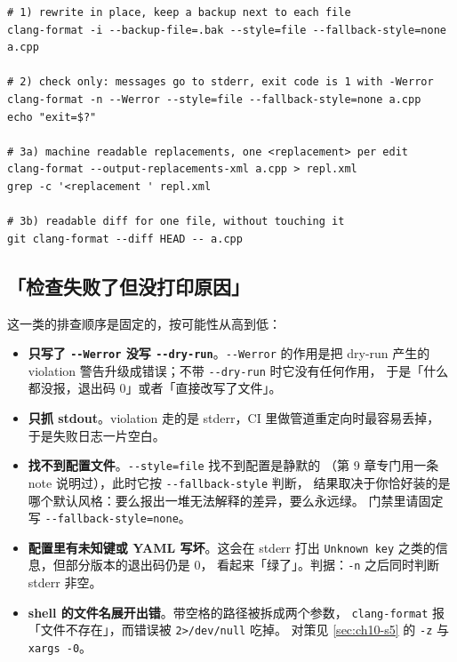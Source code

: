 \documentclass[12pt,a4paper,fontset=fandol]{ctexbook}
\newcommand{\Opt}[1]{\texttt{-\/-#1}}
\begin{document}
\begin{lstlisting}[style=shellstyle,caption={三种模式的真实调用与输出形态},label={lst:ch10-modes}]
# 1) rewrite in place, keep a backup next to each file
clang-format -i --backup-file=.bak --style=file --fallback-style=none a.cpp

# 2) check only: messages go to stderr, exit code is 1 with -Werror
clang-format -n --Werror --style=file --fallback-style=none a.cpp
echo "exit=$?"

# 3a) machine readable replacements, one <replacement> per edit
clang-format --output-replacements-xml a.cpp > repl.xml
grep -c '<replacement ' repl.xml

# 3b) readable diff for one file, without touching it
git clang-format --diff HEAD -- a.cpp
\end{lstlisting}

\subsection{「检查失败了但没打印原因」}\label{sec:ch10-s1-exit}

这一类的排查顺序是固定的，按可能性从高到低：

\begin{itemize}
  \item \textbf{只写了 \Opt{Werror} 没写 \Opt{dry-run}}。\Opt{Werror} 的作用是把
    dry-run 产生的 violation 警告升级成错误；不带 \Opt{dry-run} 时它没有任何作用，
    于是「什么都没报，退出码 0」或者「直接改写了文件」。
  \item \textbf{只抓 stdout}。violation 走的是 stderr，CI 里做管道重定向时最容易丢掉，
    于是失败日志一片空白。
  \item \textbf{找不到配置文件}。\Opt{style=file} 找不到配置是静默的
    （第 9 章专门用一条 note 说明过），此时它按 \Opt{fallback-style} 判断，
    结果取决于你恰好装的是哪个默认风格：要么报出一堆无法解释的差异，要么永远绿。
    门禁里请固定写 \Opt{fallback-style=none}。
  \item \textbf{配置里有未知键或 YAML 写坏}。这会在 stderr 打出
    \texttt{Unknown key} 之类的信息，但部分版本的退出码仍是 0，
    看起来「绿了」。判据：\texttt{-n} 之后同时判断 stderr 非空。
  \item \textbf{shell 的文件名展开出错}。带空格的路径被拆成两个参数，
    \texttt{clang-format} 报「文件不存在」，而错误被 \texttt{2>/dev/null} 吃掉。
    对策见 \ref{sec:ch10-s5} 的 \texttt{-z} 与 \texttt{xargs -0}。
\end{itemize}
\end{document}
